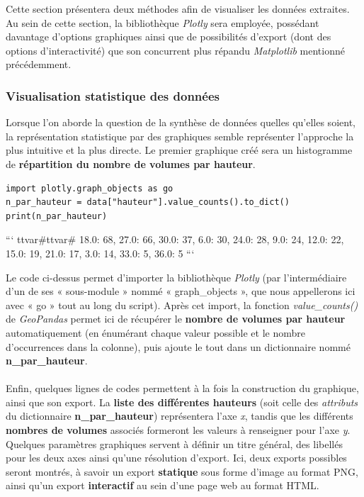 \documentclass[
  11pt,
  french,
]{article}
\begin{document}
Cette section présentera deux méthodes afin de visualiser les données
extraites. Au sein de cette section, la bibliothèque \emph{Plotly} sera
employée, possédant davantage d'options graphiques ainsi que de
possibilités d'export (dont des options d'interactivité) que son
concurrent plus répandu \emph{Matplotlib} mentionné précédemment.

\hypertarget{visualisation-statistique-des-donnuxe9es}{%
\subsubsection{Visualisation statistique des
données}\label{visualisation-statistique-des-donnuxe9es}}

Lorsque l'on aborde la question de la synthèse de données quelles
qu'elles soient, la représentation statistique par des graphiques semble
représenter l'approche la plus intuitive et la plus directe. Le premier
graphique créé sera un histogramme de \textbf{répartition du nombre de
volumes par hauteur}.

\begin{tcolorbox}[title= Moyens d'export et de synthèse des données récoltées ,colback=boitecode]
\begin{lstlisting}[style=code]
import plotly.graph_objects as go
n_par_hauteur = data["hauteur"].value_counts().to_dict()
print(n_par_hauteur)\end{lstlisting}

```
ttvar{#}ttvar{#} {18.0: 68, 27.0: 66, 30.0: 37, 6.0: 30, 24.0: 28, 9.0: 24, 12.0: 22, 15.0: 19, 21.0: 17, 3.0: 14, 33.0: 5, 36.0: 5}
```

\end{tcolorbox}

Le code ci-dessus permet d'importer la bibliothèque \emph{Plotly} (par
l'intermédiaire d'un de ses « sous-module » nommé « graph\_objects »,
que nous appellerons ici avec « go » tout au long du script). Après cet
import, la fonction \emph{value\_counts()} de \emph{GeoPandas} permet
ici de récupérer le \textbf{nombre de volumes par hauteur}
automatiquement (en énumérant chaque valeur possible et le nombre
d'occurrences dans la colonne), puis ajoute le tout dans un dictionnaire
nommé \textbf{n\_par\_hauteur}.\\
~\\
Enfin, quelques lignes de codes permettent à la fois la construction du
graphique, ainsi que son export. La \textbf{liste des différentes
hauteurs} (soit celle des \emph{attributs} du dictionnaire
\textbf{n\_par\_hauteur}) représentera l'axe \emph{x}, tandis que les
différents \textbf{nombres de volumes} associés formeront les valeurs à
renseigner pour l'axe \emph{y}. Quelques paramètres graphiques servent à
définir un titre général, des libellés pour les deux axes ainsi qu'une
résolution d'export. Ici, deux exports possibles seront montrés, à
savoir un export \textbf{statique} sous forme d'image au format PNG,
ainsi qu'un export \textbf{interactif} au sein d'une page web au format
HTML.
\end{document}
